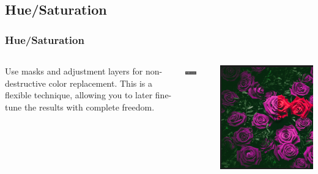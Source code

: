 \documentclass{beamer}
\begin{document}
			\subsection{Hue/Saturation}		
	\begin{frame}
		\frametitle{Hue/Saturation}
			\begin{columns}
			\vspace{-25pt}
				\begin{outline}
					\1 Use masks and adjustment layers for non-destructive color replacement.
					\1 This is a flexible technique, allowing you to later fine-tune the results with complete freedom.
				\end{outline}
			\begin{center}
			\includegraphics[width=0.5\textwidth]{images/hue saturation.png}
			\end{center}
				\includegraphics[width=1.0\textwidth]{images/replace color hue.png}
			\end{columns}
		\end{frame}
	
\end{document}
